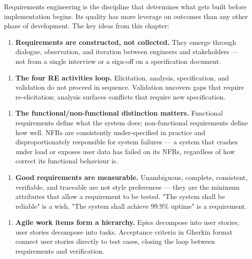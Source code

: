 \documentclass[11pt,a4paper]{book}
\begin{document}
Requirements engineering is the discipline that determines what gets built before implementation begins. Its quality has more leverage on outcomes than any other phase of development. The key ideas from this chapter:

\begin{enumerate}
  \item \textbf{Requirements are constructed, not collected.} They emerge through dialogue, observation, and iteration between engineers and stakeholders --- not from a single interview or a sign-off on a specification document.
\end{enumerate}

\begin{enumerate}
  \item \textbf{The four RE activities loop.} Elicitation, analysis, specification, and validation do not proceed in sequence. Validation uncovers gaps that require re-elicitation; analysis surfaces conflicts that require new specification.
\end{enumerate}

\begin{enumerate}
  \item \textbf{The functional/non-functional distinction matters.} Functional requirements define what the system does; non-functional requirements define how well. NFRs are consistently under-specified in practice and disproportionately responsible for system failures --- a system that crashes under load or exposes user data has failed on its NFRs, regardless of how correct its functional behaviour is.
\end{enumerate}

\begin{enumerate}
  \item \textbf{Good requirements are measurable.} Unambiguous, complete, consistent, verifiable, and traceable are not style preferences --- they are the minimum attributes that allow a requirement to be tested. "The system shall be reliable" is a wish. "The system shall achieve 99.9\% uptime" is a requirement.
\end{enumerate}

\begin{enumerate}
  \item \textbf{Agile work items form a hierarchy.} Epics decompose into user stories; user stories decompose into tasks. Acceptance criteria in Gherkin format connect user stories directly to test cases, closing the loop between requirements and verification.
\end{enumerate}
\end{document}
